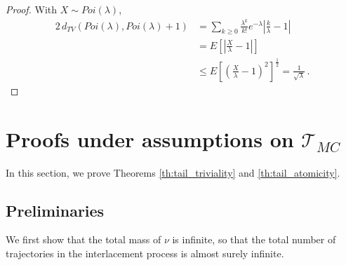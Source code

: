 \documentclass[12pt,a4paper]{article}
\newtheorem{remark}[theo]{Remark}
\newcommand{\1}[1]{{\mathbf 1}{\{#1\}}}
\newcommand{\8}{{\infty}}
\begin{document}
\begin{proof}
With $X\sim Poi(\lambda)$, 
\begin{equation}
  \begin{aligned}
    2 \, d_{TV}(Poi(\lambda), Poi(\lambda)+1)  
    & = \sum_{k\ge 0} \frac{\lambda^k}{k!} e^{-\lambda} \left|\frac{k}{\lambda}-1 \right|\\
    & = E\left[\left|\frac{X}{\lambda} - 1 \right|\right]\\ 
    & \le E\left[\left(\frac{X}{\lambda} - 1 \right)^2 \right]^{\frac{1}{2}}
     = \frac{1}{\sqrt{\lambda}}\, .
  \end{aligned}
\end{equation}
\end{proof}




\section{Proofs under assumptions on \texorpdfstring{$\mathcal{T}_{MC}$}{TMC}}

In this section, we prove Theorems \ref{th:tail_triviality} and \ref{th:tail_atomicity}.


\subsection{Preliminaries}\label{sec:prelim_tail_assump}


We first show that the total mass of $\nu$ is infinite, so that the total number of trajectories in the interlacement process is almost surely infinite.
\end{document}
